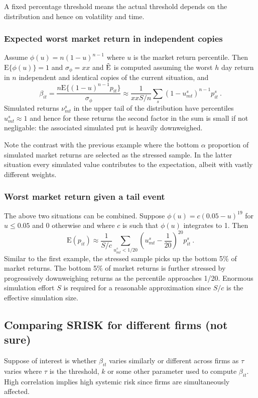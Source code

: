 \documentclass[authoryear]{elsarticle}
\newcommand{\E}{\mathrm{E}}
\begin{document}
A fixed percentage threshold means the actual threshold depends on the distribution and hence  on volatility and  time.

\subsubsection{Expected worst market return in independent copies} 

Assume $\phi(u)=n(1-u)^{n-1}$ where $u$ is the market return percentile. Then $\E\{\phi(u)\}=1$ and $\sigma_\phi=xx$  and $\Es$ is computed assuming the worst $h$ day return in $n$  independent and identical copies of the current situation, and
$$
\beta_{it} = \frac{n\E\{(1-u)^{n-1}p_{it}\}}{\sigma_\phi} \approx \frac{1}{xxS/n} \sum_s (1-u^s_{mt})^{n-1}p_{it}^s \ . 
$$
Simulated returns $\nu^s_{mt}$ in the upper tail of the distribution  have percentiles $u^s_{mt}\approx 1$ and hence for these returns the second factor in the sum is  small if not negligable: the associated simulated put  is heavily downweighed.

Note the contrast with the previous example where the bottom $\alpha$ proportion of simulated market returns are selected as the stressed sample. In the latter situation every simulated value contributes to the expectation, albeit with vastly different weights.


\subsubsection{Worst market return given a tail event}

The above two situations can be combined.   Suppose  $\phi(u)=c(0.05-u)^{19}$ for $u\le 0.05$ and 0 otherwise and where $c$ is such that $\phi(u)$ integrates to 1.  Then
$$
\E(p_{it}) \approx \frac{1}{S/c}\sum_{u^s_{mt}<1/20}  \left(u^s_{mt}-\frac{1}{20}\right)^{20}p_{it}^s\ .
$$
 Similar to the first example, the stressed sample picks up the bottom 5\% of market returns. The bottom 5\% of market returns is further stressed by  progressively downweighing returns as the percentile approaches 1/20.   Enormous simulation effort $S$ is required for a reasonable approximation since $S/c$ is the effective simulation size.

\subsection{Comparing SRISK for different firms (not sure)}

Suppose of interest is whether $\beta_{it}$ varies similarly or different across firms as $\tau$ varies where $\tau$ is the threshold, $k$ or some other parameter used to compute $\beta_{it}$. High correlation implies high systemic risk since firms are simultaneously affected.
\end{document}
